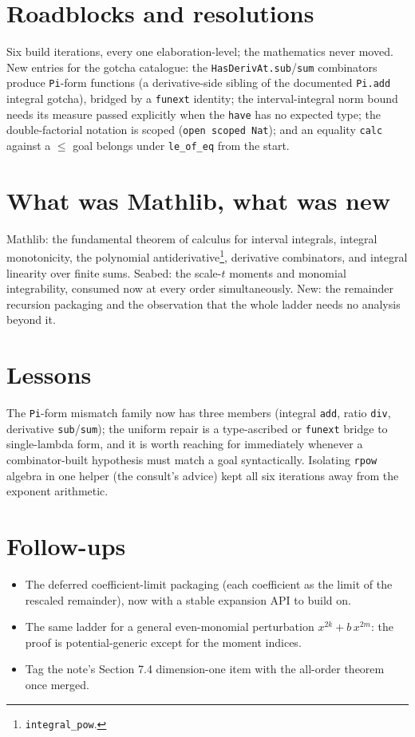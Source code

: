 \documentclass[11pt]{article}
\begin{document}
\section{Roadblocks and resolutions}

Six build iterations, every one elaboration-level; the mathematics
never moved. New entries for the gotcha catalogue: the
\texttt{HasDerivAt.sub}/\texttt{sum} combinators produce \texttt{Pi}-form
functions (a derivative-side sibling of the documented \texttt{Pi.add}
integral gotcha), bridged by a \texttt{funext} identity; the
interval-integral norm bound needs its measure passed explicitly when
the \texttt{have} has no expected type; the double-factorial notation
is scoped (\texttt{open scoped Nat}); and an equality \texttt{calc}
against a $\leq$ goal belongs under \texttt{le\_of\_eq} from the start.

\section{What was Mathlib, what was new}

Mathlib: the fundamental theorem of calculus for interval integrals,
integral monotonicity, the polynomial
antiderivative\footnote{\texttt{integral\_pow}.}, derivative
combinators, and integral linearity over finite sums. Seabed: the scale-$t$ moments
and monomial integrability, consumed now at every order
simultaneously. New: the remainder recursion packaging and the
observation that the whole ladder needs no analysis beyond it.

\section{Lessons}

The \texttt{Pi}-form mismatch family now has three members (integral
\texttt{add}, ratio \texttt{div}, derivative \texttt{sub}/\texttt{sum});
the uniform repair is a type-ascribed or \texttt{funext} bridge to
single-lambda form, and it is worth reaching for immediately whenever a
combinator-built hypothesis must match a goal syntactically. Isolating
\texttt{rpow} algebra in one helper (the consult's advice) kept all six
iterations away from the exponent arithmetic.

\section{Follow-ups}

\begin{itemize}
\item The deferred coefficient-limit packaging (each coefficient as the
limit of the rescaled remainder), now with a stable expansion API to
build on.
\item The same ladder for a general even-monomial perturbation
$x^{2k} + b\,x^{2m}$: the proof is potential-generic except for the
moment indices.
\item Tag the note's Section 7.4 dimension-one item with the all-order
theorem once merged.
\end{itemize}
\end{document}
